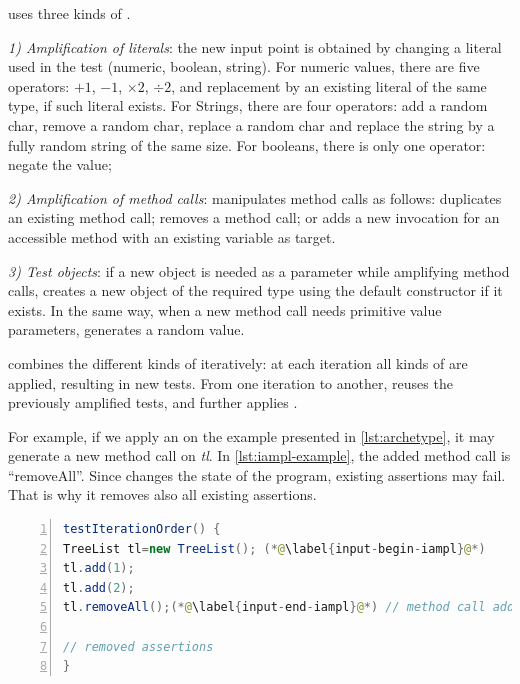 \dspot uses three kinds of \Iampl.

\emph{1) Amplification of literals}: the new input point is obtained by changing a literal used in the test (numeric, boolean, string).
For numeric values, there are five operators: $+1$, $-1$, $\times 2$, $ \div 2$, and replacement by an existing literal of the same type, if such literal exists.
For Strings, there are four operators: add a random char, remove a random char, replace a random char and replace the string by a fully random string of the same size.
For booleans, there is only one operator: negate the value;

\emph{2) Amplification of method calls}: \dspot manipulates method calls as follows:
\dspot duplicates an existing method call; removes a method call;
or adds a new invocation for an accessible method with an existing variable as target.

\emph{3) Test objects}:
if a new object is needed as a parameter while amplifying method calls, \dspot creates a new object of the required type using the default constructor if it exists.
In the same way, when a new method call needs primitive value parameters, \dspot generates a random value.

\dspot combines the different kinds of \Iampl iteratively: at each iteration all kinds of \Iampl are applied, resulting in new tests. 
From one iteration to another, \dspot reuses the previously amplified tests, and further applies \Iampl{}.

For example, if we apply an \Iampl on the example presented in \autoref{lst:archetype}, it may generate a new method call on \emph{tl}.
In \autoref{lst:iampl-example}, the added method call is ``removeAll''. Since \dspot changes the state of the program, existing assertions may fail. That is why it removes also all existing assertions.


\begin{lstlisting}[caption={An example of an \Iampl{}: the amplification added a method call to \emph{removeAll()} on \emph{tl}.},label=lst:iampl-example,float,language=java,numbers=left] 
testIterationOrder() {
TreeList tl=new TreeList(); (*@\label{input-begin-iampl}@*)
tl.add(1);
tl.add(2);
tl.removeAll();(*@\label{input-end-iampl}@*) // method call added

// removed assertions
}
\end{lstlisting}

